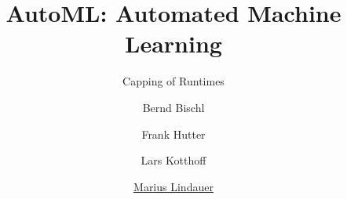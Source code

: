 




\title[AutoML: Overview]{AutoML: Automated Machine Learning}
\subtitle{Capping of Runtimes}
\author[Marius Lindauer]{Bernd Bischl \and Frank Hutter \and Lars Kotthoff \and \underline{Marius Lindauer}}
\institute{}
\date{}





	
	\maketitle


